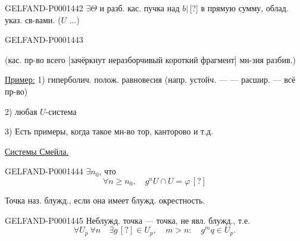 \begin{GelfandAdjacentEvidence}{GELFAND-P000144}{2}
$\exists\Theta$ и разб. кас. пучка над $b\vert$\,[?] в прямую сумму,
облад. указ. св-вами. ($U$ $\ldots$)
\end{GelfandAdjacentEvidence}
\begin{GelfandAdjacentEvidence}{GELFAND-P000144}{3}

(кас. пр-во всего [зачёркнут неразборчивый короткий фрагмент] мн-зия разбив.)
\end{GelfandAdjacentEvidence}

\underline{Пример:} 1) гиперболич. полож. равновесия
(напр. устойч. — — расшир. — всё пр-во)

2) любая $U$-система

3) Есть примеры, когда такое мн-во тор, канторово и т.д.

\underline{Системы Смейла.}


\begin{GelfandAdjacentEvidence}{GELFAND-P000144}{4}
 $\exists n_0$, что
\begin{equation*}
\forall n\ge n_0,\quad g^n U\cap U=\varphi\,[?]
\end{equation*}
\end{GelfandAdjacentEvidence}

Точка наз. блужд., если она имеет блужд. окрестность.

\begin{GelfandAdjacentEvidence}{GELFAND-P000144}{5}
Неблужд. точка — точка, не явл. блужд., т.е.
\begin{equation*}
\forall U_p\ \forall n\quad \exists g\,[?]\in U_p,\quad m>n:\quad g^m q\in U_p.
\end{equation*}
\end{GelfandAdjacentEvidence}

